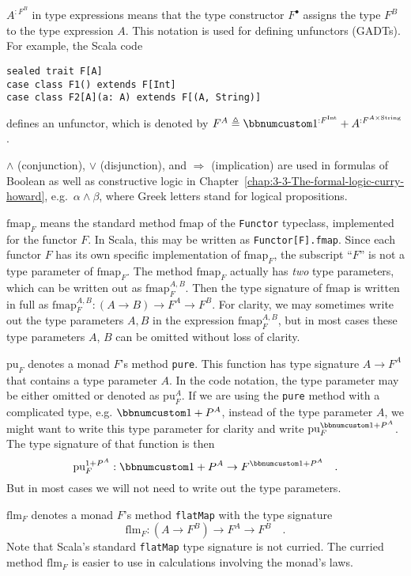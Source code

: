 $A^{:F^{B}}$ in type expressions means that the type constructor
$F^{\bullet}$ assigns the type $F^{B}$ to the type expression $A$.
This notation is used for defining unfunctors (GADTs). For example,
the Scala code

\begin{lstlisting}
sealed trait F[A]
case class F1() extends F[Int]
case class F2[A](a: A) extends F[(A, String)]
\end{lstlisting}
defines an unfunctor, which is denoted by $F^{A}\triangleq\bbnum 1^{:F^{\text{Int}}}+A^{:F^{A\times\text{String}}}$.

$\wedge$ (conjunction), $\vee$ (disjunction), and $\Rightarrow$
(implication) are used in formulas of Boolean as well as constructive
logic in Chapter~\ref{chap:3-3-The-formal-logic-curry-howard}, e.g.~$\alpha\wedge\beta$,
where Greek letters stand for logical propositions.

$\text{fmap}_{F}$ means the standard method $\text{fmap}$ of the
\lstinline!Functor! typeclass, implemented for the functor $F$.
In Scala, this may be written as \texttt{}\lstinline!Functor[F].fmap!.
Since each functor $F$ has its own specific implementation of $\text{fmap}_{F}$,
the subscript \textsf{``}$F$\textsf{''} is not a type parameter of $\text{fmap}_{F}$.
The method $\text{fmap}_{F}$ actually has \emph{two} type parameters,
which can be written out as $\text{fmap}_{F}^{A,B}$. Then the type
signature of $\text{fmap}$ is written in full as $\text{fmap}_{F}^{A,B}:\left(A\rightarrow B\right)\rightarrow F^{A}\rightarrow F^{B}$.
For clarity, we may sometimes write out the type parameters $A,B$
in the expression $\text{fmap}_{F}^{A,B}$, but in most cases these
type parameters $A$, $B$ can be omitted without loss of clarity.

$\text{pu}_{F}$ denotes a monad $F$'s method \lstinline!pure!.
This function has type signature $A\rightarrow F^{A}$ that contains
a type parameter $A$. In the code notation, the type parameter may
be either omitted or denoted as $\text{pu}_{F}^{A}$. If we are using
the \lstinline!pure! method with a complicated type, e.g. $\bbnum 1+P^{A}$,
instead of the type parameter $A$, we might want to write this type
parameter for clarity and write $\text{pu}_{F}^{\bbnum 1+P^{A}}$.
The type signature of that function is then 
\[
\text{pu}_{F}^{1+P^{A}}:\bbnum 1+P^{A}\rightarrow F^{\bbnum 1+P^{A}}\quad.
\]
But in most cases we will not need to write out the type parameters.

$\text{flm}_{F}$ denotes a monad $F$'s method \lstinline!flatMap!
with the type signature
\[
\text{flm}_{F}:\left(A\rightarrow F^{B}\right)\rightarrow F^{A}\rightarrow F^{B}\quad.
\]
Note that Scala's standard \lstinline!flatMap! type signature is
not curried. The curried method $\text{flm}_{F}$ is easier to use
in calculations involving the monad's laws.

